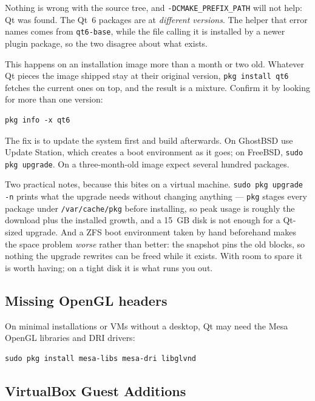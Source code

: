 \documentclass[11pt]{article}
\begin{document}
Nothing is wrong with the source tree, and
\texttt{-DCMAKE\_PREFIX\_PATH} will not help: Qt was found.  The Qt~6
packages are at \emph{different versions}.  The helper that error names
comes from \texttt{qt6-base}, while the file calling it is installed by a
newer plugin package, so the two disagree about what exists.

This happens on an installation image more than a month or two old.
Whatever Qt pieces the image shipped stay at their original version,
\texttt{pkg install qt6} fetches the current ones on top, and the result
is a mixture.  Confirm it by looking for more than one version:
\begin{lstlisting}
pkg info -x qt6
\end{lstlisting}

The fix is to update the system first and build afterwards.  On GhostBSD
use Update Station, which creates a boot environment as it goes; on
FreeBSD, \texttt{sudo pkg upgrade}.  On a three-month-old image expect
several hundred packages.

Two practical notes, because this bites on a virtual machine.
\texttt{sudo pkg upgrade -n} prints what the upgrade needs without
changing anything --- \texttt{pkg} stages every package under
\texttt{/var/cache/pkg} before installing, so peak usage is roughly the
download plus the installed growth, and a 15~GB disk is not enough for a
Qt-sized upgrade.  And a ZFS boot environment taken by hand beforehand
makes the space problem \emph{worse} rather than better: the snapshot
pins the old blocks, so nothing the upgrade rewrites can be freed while
it exists.  With room to spare it is worth having; on a tight disk it is
what runs you out.

\subsection{Missing OpenGL headers}

On minimal installations or VMs without a desktop, Qt may need the Mesa
OpenGL libraries and DRI drivers:
\begin{lstlisting}
sudo pkg install mesa-libs mesa-dri libglvnd
\end{lstlisting}

\subsection{VirtualBox Guest Additions}
\end{document}

